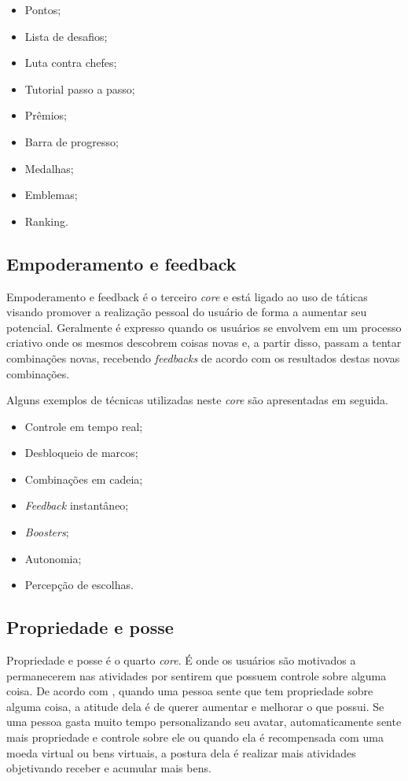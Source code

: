 \begin{itemize}
	\item Pontos;
	\item Lista de desafios;
	\item Luta contra chefes;
	\item Tutorial passo a passo;
	\item Prêmios;
	\item Barra de progresso;
	\item Medalhas;
	\item Emblemas;
	\item Ranking.
\end{itemize}


\subsection{Empoderamento e feedback}
Empoderamento e feedback é o terceiro \textit{core} e está ligado ao uso de táticas visando promover a realização pessoal
do usuário de forma a aumentar seu potencial. Geralmente é expresso quando os usuários se envolvem em um processo criativo
onde os mesmos descobrem coisas novas e, a partir disso, passam a tentar combinações novas, recebendo \textit{feedbacks}
de acordo com os resultados destas novas combinações.

Alguns exemplos de técnicas utilizadas neste \textit{core} são apresentadas em seguida.

\begin{itemize}
	\item Controle em tempo real;
	\item Desbloqueio de marcos;
	\item Combinações em cadeia;
	\item \textit{Feedback} instantâneo;
	\item \textit{Boosters};
	\item Autonomia;
	\item Percepção de escolhas.
\end{itemize}



\subsection{Propriedade e posse}
Propriedade e posse é o quarto \textit{core}. É onde os usuários são motivados a permanecerem nas atividades por
sentirem que possuem controle sobre alguma coisa. De acordo com , quando uma pessoa
sente que tem propriedade sobre alguma coisa, a atitude dela é de querer aumentar e melhorar o que possui. Se uma pessoa
gasta muito tempo personalizando seu avatar, automaticamente sente mais propriedade e controle sobre ele ou quando ela é
recompensada com uma moeda virtual ou bens virtuais, a postura dela é realizar mais atividades objetivando receber
e acumular mais bens.


